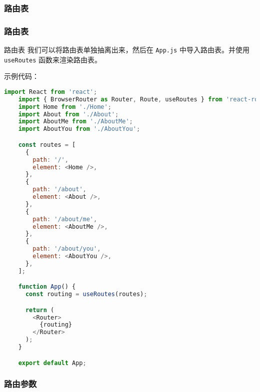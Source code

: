 \documentclass{beamer}
\begin{document}
\subsubsection{路由表}
\begin{frame}
  \frametitle{路由表}

  \begin{block}{路由表}
    我们可以将路由表单独抽离出来，然后在 \texttt{App.js} 中导入路由表。并使用 \texttt{useRoutes} 函数来渲染路由表。
  \end{block}

  示例代码：

  \begin{lstlisting}[language=JavaScript]
    import React from 'react';
    import { BrowserRouter as Router, Route, useRoutes } from 'react-router-dom';
    import Home from './Home';
    import About from './About';
    import AboutMe from './AboutMe';
    import AboutYou from './AboutYou';

    const routes = [
      {
        path: '/',
        element: <Home />,
      },
      {
        path: '/about',
        element: <About />,
      },
      {
        path: '/about/me',
        element: <AboutMe />,
      },
      {
        path: '/about/you',
        element: <AboutYou />,
      },
    ];

    function App() {
      const routing = useRoutes(routes);

      return (
        <Router>
          {routing}
        </Router>
      );
    }

    export default App;
  \end{lstlisting}

\end{frame}

\subsubsection{路由参数}
\end{document}
